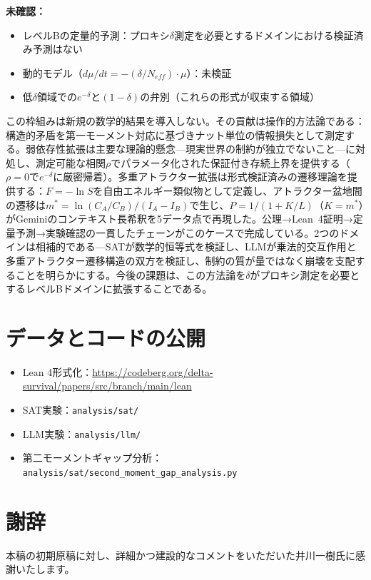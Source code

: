 \documentclass[11pt,a4paper]{article}
\begin{document}
\textbf{未確認：}
\begin{itemize}
    \item レベルBの定量的予測：プロキシ$\delta$測定を必要とするドメインにおける検証済み予測はない
    \item 動的モデル（$d\mu/dt = -(\delta/N_{eff}) \cdot \mu$）：未検証
    \item 低$\delta$領域での$e^{-\delta}$と$(1-\delta)$の弁別（これらの形式が収束する領域）
\end{itemize}

この枠組みは新規の数学的結果を導入しない。その貢献は操作的方法論である：構造的矛盾を第一モーメント対応に基づきナット単位の情報損失として測定する。弱依存性拡張は主要な理論的懸念---現実世界の制約が独立でないこと---に対処し、測定可能な相関$\rho$でパラメータ化された保証付き存続上界を提供する（$\rho = 0$で$e^{-\delta}$に厳密帰着）。多重アトラクター拡張は形式検証済みの遷移理論を提供する：$F = -\ln S$を自由エネルギー類似物として定義し、アトラクター盆地間の遷移は$m^* = \ln(C_A/C_B)/(I_A - I_B)$で生じ、$P = 1/(1 + K/L)$（$K = m^*$）がGeminiのコンテキスト長希釈を5データ点で再現した。公理→Lean~4証明→定量予測→実験確認の一貫したチェーンがこのケースで完成している。2つのドメインは相補的である---SATが数学的恒等式を検証し、LLMが乗法的交互作用と多重アトラクター遷移構造の双方を検証し、制約の質が量ではなく崩壊を支配することを明らかにする。今後の課題は、この方法論を$\delta$がプロキシ測定を必要とするレベルBドメインに拡張することである。

\section*{データとコードの公開}

\begin{itemize}
    \item Lean 4形式化：\url{https://codeberg.org/delta-survival/papers/src/branch/main/lean}
    \item SAT実験：\texttt{analysis/sat/}
    \item LLM実験：\texttt{analysis/llm/}
    \item 第二モーメントギャップ分析：\texttt{analysis/sat/second\_moment\_gap\_analysis.py}
\end{itemize}

\section*{謝辞}
本稿の初期原稿に対し、詳細かつ建設的なコメントをいただいた井川一樹氏に感謝いたします。
\end{document}
